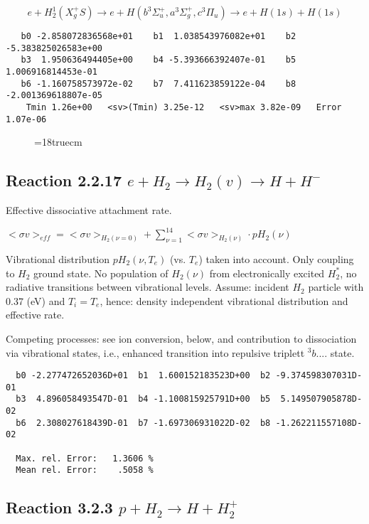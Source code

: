 \begin{displaymath}
 e + H_2^1 (X_g^+ S ) \rightarrow e + H (b^3\Sigma^+_u , a^3\Sigma^+_g,
c^3\Pi_u)
             \rightarrow e + H(1s) + H(1s)
\end{displaymath}



\begin{verbatim}
   b0 -2.858072836568e+01    b1  1.038543976082e+01    b2 -5.383825026583e+00
   b3  1.950636494405e+00    b4 -5.393666392407e-01    b5  1.006916814453e-01
   b6 -1.160758573972e-02    b7  7.411623859122e-04    b8 -2.001369618807e-05
    Tmin 1.26e+00   <sv>(Tmin) 3.25e-12   <sv>max 3.82e-09   Error 1.07e-06
\end{verbatim}
\begin{figure} \label{2.2.5.or}
\epsfxsize=18truecm
\end{figure}

 \newpage

\subsection{
Reaction 2.2.17  $e + H_2 \rightarrow H_2(v) \rightarrow H + H^-$
}
Effective dissociative attachment rate.

$ <\sigma v>_{eff} = <\sigma v>_{H_2(\nu=0)} + \sum_{\nu=1}^{14}
<\sigma v>_{H_2(\nu)} \cdot pH_2(\nu) $

Vibrational distribution $pH_2(\nu,T_e)$ (vs. $T_e$) taken into
account. Only coupling
to $H_2$ ground state. No population of $H_2(\nu)$ from electronically
excited $H_2^*$, no radiative transitions between vibrational levels.
Assume: incident $H_2$ particle with 0.37 (eV) and $T_i = T_e$,
hence: density independent vibrational distribution and effective
rate.

Competing processes: see ion conversion, below, and contribution to
dissociation via vibrational states, i.e., enhanced transition into
repulsive triplett $^3b....$ state.

\begin{verbatim}
  b0 -2.277472652036D+01  b1  1.600152183523D+00  b2 -9.374598307031D-01
  b3  4.896058493547D-01  b4 -1.100815925791D+00  b5  5.149507905878D-02
  b6  2.308027618439D-01  b7 -1.697306931022D-02  b8 -1.262211557108D-02

  Max. rel. Error:   1.3606 %
  Mean rel. Error:    .5058 %

\end{verbatim}
\subsection{
Reaction 3.2.3   $p + H_2 \rightarrow H + H_2^+  $
}

